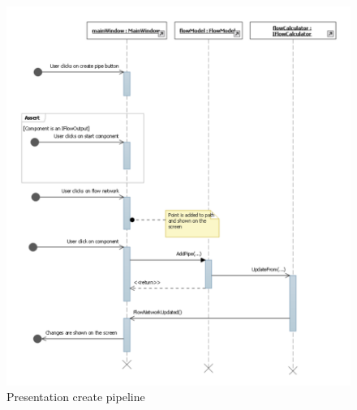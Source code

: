 \begin{figure}[h!]
	\centering
	\includegraphics[width=\textwidth]{figures/PresentationCreateConnection.pdf}
	\caption{Presentation create pipeline}
	\label{fig:seqprespipe}
\end{figure}
